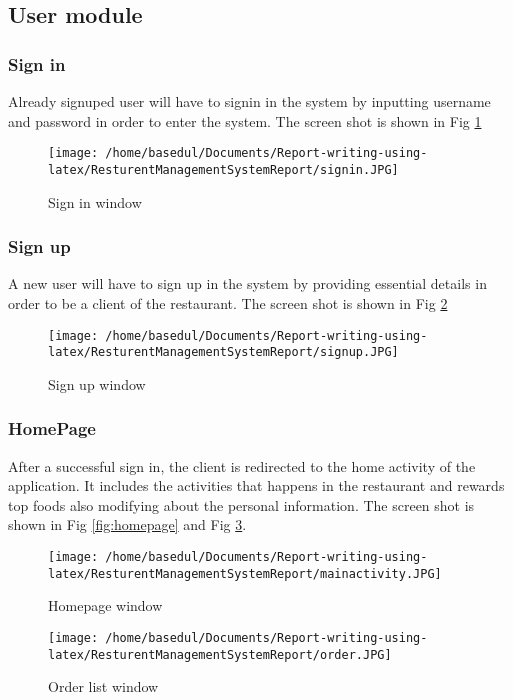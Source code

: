\documentclass[12pt,a4paper]{article}
\newcommand\tab[1][1cm]{\hspace*{#1}}
\begin{document}
	\subsection{User module}
		\subsubsection{Sign in}
			\tab Already signuped user will have to signin in the system by inputting username and password in order to enter the system. The screen shot is shown in Fig \ref{fig:signin} 
			\begin{figure}[H]
		\centering
		\texttt{[image: /home/basedul/Documents/Report-writing-using-latex/ResturentManagementSystemReport/signin.JPG]}
		\caption{Sign in window}
		\label{fig:signin} 
		\end{figure}
		
		\subsubsection{Sign up}
			\tab A new user will have to sign up in the system by providing essential details in order to be a client of the restaurant. The screen shot is shown in Fig \ref{fig:signout} 
			\begin{figure}[H]
		\centering
		\texttt{[image: /home/basedul/Documents/Report-writing-using-latex/ResturentManagementSystemReport/signup.JPG]}
		\caption{Sign up window}
		\label{fig:signout} 
		\end{figure}
		\newpage
		\subsubsection{HomePage}
			\tab After a successful sign in, the client is redirected to the home activity of the application.  It includes the activities that happens in the restaurant and rewards  top foods also modifying about the personal information. The screen shot is shown in Fig \ref{fig:homepage} and Fig \ref{fig:topfood1}.
			\begin{figure}[H]
		\centering
		\texttt{[image: /home/basedul/Documents/Report-writing-using-latex/ResturentManagementSystemReport/mainactivity.JPG]}
		\caption{Homepage window}
		\label{fig:homepage} 
		
		
		\vspace{2cm}
		
		
		\texttt{[image: /home/basedul/Documents/Report-writing-using-latex/ResturentManagementSystemReport/order.JPG]}
		\caption{Order list window}
		\label{fig:topfood1} 	
		
		
		\end{figure}
		\newpage
\end{document}
